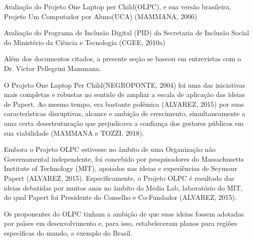 \documentclass[
12pt,		%
openright,	%
twoside,  %
a4paper,			%
chapter=TITLE,		%
english,			%
french,				%
spanish,			%
brazil				%
]{USPSC-classe/USPSC}
\begin{document}
\begin{alineas}
\item Avalia\c{c}\~ao do Projeto \textquotedbl One Laptop per Child\textquotedbl  (OLPC), e sua vers\~ao brasileira, \textquotedbl Projeto Um Computador por Aluno\textquotedbl  (UCA)  (MAMMANA, 2006)
\item Avalia\c{c}\~ao do Programa de Inclus\~ao Digital (PID) da Secretaria de Inclus\~ao Social do Minist\'erio da Ci\^encia e Tecnologia  (CGEE, 2010a)
\end{alineas}

Al\'em dos documentos citados, a presente se\c{c}\~ao se baseou em entrevistas com o Dr. Victor Pellegrini Mammana.










O Projeto \textquotedbl One Laptop Per Child\textquotedbl  (NEGROPONTE, 2004) foi uma das iniciativas mais completas e robustas no sentido de ampliar a escala de aplica\c{c}\~ao das ideias de Papert. Ao mesmo tempo, era bastante pol\^emica (ALVAREZ, 2015) por suas caracter\'{\i}sticas disruptivas, alcance e ambi\c{c}\~ao de crescimento, simultaneamente a uma certa desestrutura\c{c}\~ao que prejudicava a confian\c{c}a dos gestores p\'ublicos em sua viabilidade (MAMMANA e TOZZI, 2018).










Embora o Projeto OLPC estivesse no \^ambito de uma Organiza\c{c}\~ao n\~ao Governamental independente,  foi concebido por pesquisadores do Massachusetts Institute of Technology (MIT), apoiados nas ideias e experi\^encias de Seymour Papert  (ALVAREZ, 2015). Especificamente, o Projeto OLPC \'e resultado das ideias debatidas por muitos anos no \^ambito do Media Lab, laborat\'orio do MIT, do qual Papert foi Presidente do Conselho e Co-Fundador  (ALVAREZ, 2015).










Os proponentes do OLPC tinham a ambi\c{c}\~ao de que suas ideias fossem adotadas por pa\'{\i}ses em desenvolvimento e, para isso, estabeleceram planos para regi\~oes espec\'{\i}ficas do mundo, a exemplo do Brasil.
\end{document}
